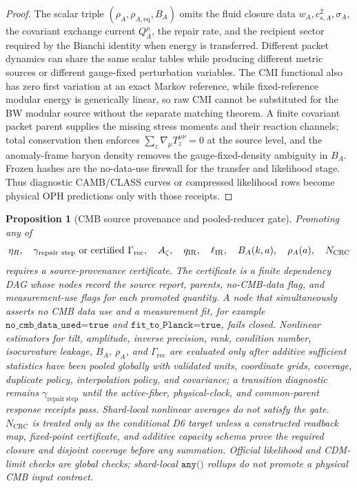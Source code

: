 \documentclass[11pt]{article}
\newtheorem{proposition}[theorem]{Proposition}
\begin{document}
\begin{proof}
The scalar triple \((\rho_A,\rho_{A,\mathrm{eq}},B_A)\) omits the fluid closure
data \(w_A,c_{s,A}^2,\sigma_A\), the covariant exchange current \(Q_A^\mu\), the
repair rate, and the recipient sector required by the Bianchi identity when
energy is transferred. Different packet dynamics can share the same scalar
tables while producing different metric sources or different gauge-fixed
perturbation variables. The CMI functional also has zero first variation at an
exact Markov reference, while fixed-reference modular energy is generically
linear, so raw CMI cannot be substituted for the BW modular source without the
separate matching theorem. A finite covariant packet parent supplies the missing
stress moments and their reaction channels; total conservation then enforces
\(\sum_z\nabla_\mu T_z^{\mu\nu}=0\) at the source level, and the anomaly-frame
baryon density removes the gauge-fixed-density ambiguity in \(B_A\). Frozen
hashes are the no-data-use firewall for the transfer and likelihood stage. Thus
diagnostic CAMB/CLASS curves or compressed likelihood rows become physical OPH
predictions only with those receipts.
\end{proof}

\begin{proposition}[CMB source provenance and pooled-reducer gate]\label{prop:compact-cmb-source-provenance-gate}
Promoting any of
\[
\eta_R,\quad \gamma_{\mathrm{repair\ step}}\hbox{ or certified }\Gamma_{\mathrm{rec}},
\quad A_\zeta,\quad q_{\mathrm{IR}},
\quad \ell_{\mathrm{IR}},\quad B_A(k,a),\quad \rho_A(a),\quad N_{\mathrm{CRC}}
\]
requires a source-provenance certificate. The certificate is a finite
dependency DAG whose nodes record the source report, parents, no-CMB-data flag,
and measurement-use flags for each promoted
quantity.  A node that simultaneously asserts no CMB data use and a
measurement fit, for example \(\texttt{no\_cmb\_data\_used=true}\) and
\(\texttt{fit\_to\_Planck=true}\), fails closed.  Nonlinear estimators for
tilt, amplitude, inverse precision, rank, condition number, isocurvature
leakage, \(B_A\), \(\rho_A\), and \(\Gamma_{\mathrm{rec}}\) are evaluated only
after additive sufficient statistics have been pooled globally with validated
units, coordinate grids, coverage, duplicate policy, interpolation policy, and
covariance; a transition diagnostic remains \(\gamma_{\mathrm{repair\ step}}\)
until the active-fiber, physical-clock, and common-parent response receipts
pass.  Shard-local nonlinear averages do not satisfy the gate.
\(N_{\mathrm{CRC}}\) is treated only as the conditional D6 target unless a constructed readback map,
fixed-point certificate, and additive capacity schema prove the required closure and disjoint
coverage before any summation.
Official likelihood and CDM-limit checks are global checks; shard-local
\(\texttt{any()}\) rollups do not promote a physical CMB input contract.
\end{proposition}
\end{document}
